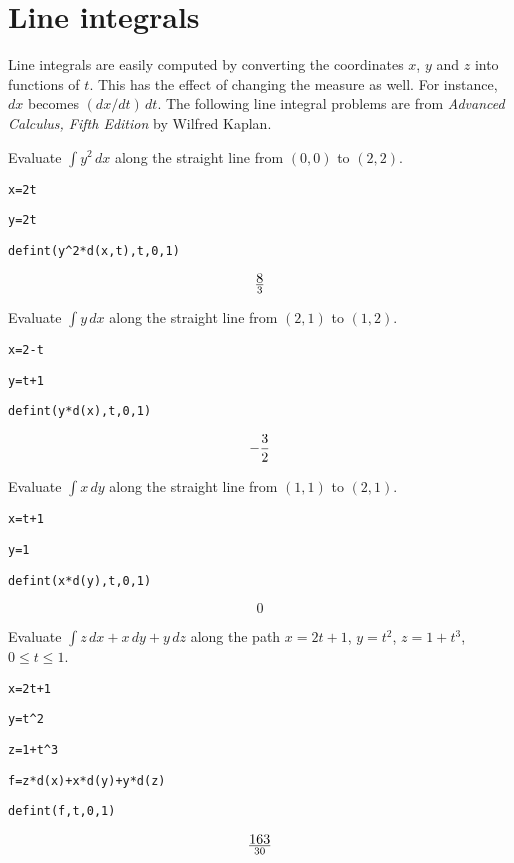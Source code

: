 \section*{Line integrals}
Line integrals are easily computed by
converting the coordinates $x$, $y$ and $z$ into functions of $t$.
This has the effect of changing the measure as well.
For instance, $dx$ becomes $(dx/dt)\,dt$.
The following line integral problems are from
{\it Advanced Calculus, Fifth Edition} by Wilfred Kaplan.

\medskip
\noindent
Evaluate $\int y^2\,dx$ along the straight
line from $(0,0)$ to $(2,2)$.

\medskip
\verb$x=2t$

\verb$y=2t$

\verb$defint(y^2*d(x,t),t,0,1)$

$$8\over3$$

\medskip
\noindent
Evaluate $\int y\,dx$ along the straight line from
$(2,1)$ to $(1,2)$.

\medskip
\verb$x=2-t$

\verb$y=t+1$

\verb$defint(y*d(x),t,0,1)$

$$-{3\over2}$$

\medskip
\noindent
Evaluate $\int x\,dy$ along the straight line from
$(1,1)$ to $(2,1)$.

\medskip
\verb$x=t+1$

\verb$y=1$

\verb$defint(x*d(y),t,0,1)$

$$0$$

\medskip
\noindent
Evaluate $\int z\,dx+x\,dy+y\,dz$
along the path
$x=2t+1$, $y=t^2$, $z=1+t^3$, $0\le t\le 1$.

\medskip
\verb$x=2t+1$

\verb$y=t^2$

\verb$z=1+t^3$

\verb$f=z*d(x)+x*d(y)+y*d(z)$

\verb$defint(f,t,0,1)$

$$163\over30$$


